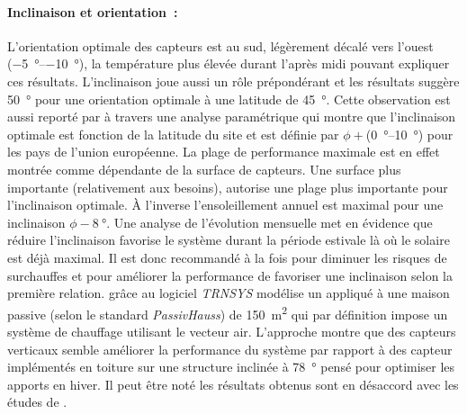 \paragraph{Inclinaison et orientation~:} %
\label{par:inclinaison_et_orientation}
L’orientation optimale des capteurs est au sud, légèrement décalé vers
l’ouest (\SIrange{-5}{-10}{\degree}), la température plus élevée durant l’après midi pouvant
expliquer ces résultats.
L’inclinaison joue aussi un rôle prépondérant et les résultats suggère \SI{50}{\degree}
pour une orientation optimale à une latitude de \SI{45}{\degree}. Cette observation est
aussi reporté par \textcite{Shariah2002587} à travers une analyse paramétrique qui montre
que l’inclinaison optimale est fonction de la latitude du site et est définie par
$\phi + $(\SIrange{0}{10}{\degree}) pour les pays de l’union européenne. La plage de performance
maximale est en effet montrée comme dépendante de la surface de capteurs.
Une surface plus importante (relativement aux besoins), autorise une plage plus importante
pour l’inclinaison optimale. À l’inverse l’ensoleillement annuel est maximal pour
une inclinaison $\phi - \SI{8}{\degree}$. Une analyse de l’évolution mensuelle met
en évidence que réduire l’inclinaison favorise le système durant la période estivale
là où le solaire est déjà maximal. Il est donc recommandé à la fois pour diminuer
les risques de surchauffes et pour améliorer la performance de favoriser une
inclinaison selon la première relation.
\textcite{Badescu2006129} grâce au logiciel \textit{TRNSYS} modélise un 
appliqué à une maison passive (selon le standard \textit{PassivHauss}) de \SI{150}{\metre\squared}
qui par définition impose un système de chauffage utilisant le vecteur air. L’approche montre que des
capteurs verticaux semble améliorer la performance du système par rapport à des
capteur implémentés en toiture sur une structure inclinée à \SI{78}{\degree} pensé pour optimiser les apports
en hiver. Il peut être noté les résultats obtenus sont en désaccord avec les études
de \textcite{Task26C2007,Shariah2002587}.


